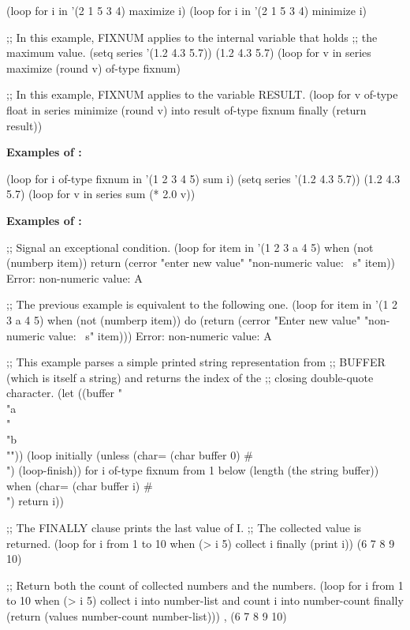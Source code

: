 \code
 (loop for i in '(2 1 5 3 4)
       maximize i)
 (loop for i in '(2 1 5 3 4)
       minimize i)
 
;; In this example, FIXNUM applies to the internal variable that holds
;; the maximum value.
 (setq series '(1.2 4.3 5.7))
\EV (1.2 4.3 5.7)
 (loop for v in series 
       maximize (round v) of-type fixnum)
 
;; In this example, FIXNUM applies to the variable RESULT.
 (loop for v of-type float in series
       minimize (round v) into result of-type fixnum
       finally (return result))
\endcode

{\bf Examples of :}

\code
 (loop for i of-type fixnum in '(1 2 3 4 5)
       sum i)
 (setq series '(1.2 4.3 5.7))
\EV (1.2 4.3 5.7)
 (loop for v in series 
       sum (* 2.0 v))
\endcode



{\bf Examples of :}

\code
;; Signal an exceptional condition.
 (loop for item in '(1 2 3 a 4 5)
       when (not (numberp item))
        return (cerror "enter new value" "non-numeric value: ~s" item))
Error: non-numeric value: A
 
;; The previous example is equivalent to the following one.
 (loop for item in '(1 2 3 a 4 5)
       when (not (numberp item))
        do (return 
            (cerror "Enter new value" "non-numeric value: ~s" item)))
Error: non-numeric value: A
\endcode

\code
;; This example parses a simple printed string representation from 
;; BUFFER (which is itself a string) and returns the index of the
;; closing double-quote character.
 (let ((buffer "\\"a\\" \\"b\\""))
   (loop initially (unless (char= (char buffer 0) #\\")
                     (loop-finish))
         for i of-type fixnum from 1 below (length (the string buffer))
         when (char= (char buffer i) #\\")
          return i))
 
;; The FINALLY clause prints the last value of I.
;; The collected value is returned.
 (loop for i from 1 to 10
       when (> i 5)
         collect i
       finally (print i))
\EV (6 7 8 9 10) 

;; Return both the count of collected numbers and the numbers.
 (loop for i from 1 to 10
       when (> i 5)
         collect i into number-list
         and count i into number-count
       finally (return (values number-count number-list)))
, (6 7 8 9 10)
\endcode

